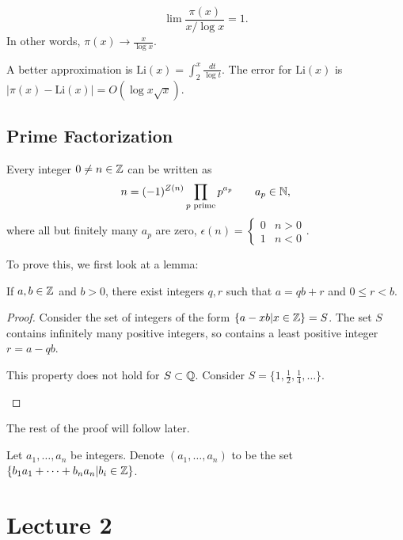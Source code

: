 \documentclass{article}
\begin{document}
\begin{theorem}
    \label{pnt}
    \[\lim \frac{\pi(x)}{x / \log x} = 1.\] In other words, $\pi(x) \to \frac{x}{\log x}$.
\end{theorem}

A better approximation is $\mathrm{Li}(x) = \int_{2}^x \frac{dt}{\log t}$. The error for $\mathrm{Li}(x)$ is $|\pi(x) - \mathrm{Li}(x)| = O(\log x \sqrt x)$.

\subsection{Prime Factorization}
\begin{theorem}
    \label{uniq}
    Every integer $0 \neq n \in \mathbb Z$ can be written as \[n = (-1)^{Z(n)} \prod_{p \text{ prime}} p^{a_p} \qquad a_p \in \mathbb N,\] where all but finitely many $a_p$ are zero, $\epsilon(n) = \begin{cases} 0 & n > 0 \\ 1 & n < 0\end{cases}$.
\end{theorem}

To prove this, we first look at a lemma:
\begin{lemma}
    \label{lemma:1}
    If $a, b \in \mathbb Z$ and $b > 0$, there exist integers $q, r$ such that $a = qb + r$ and $0 \leq r < b$.
\end{lemma}

\begin{proof}
    Consider the set of integers of the form $\{a - xb | x \in \mathbb Z\} = S$. The set $S$ contains infinitely many positive integers, so contains a least positive integer $r = a - qb$.

    \begin{remark}
        This property does not hold for $S \subset \mathbb Q$. Consider $S = \{1, \frac{1}{2}, \frac{1}{4}, \ldots\}$. 
    \end{remark}
\end{proof}

The rest of the proof will follow later.

\begin{definition}
    \label{multset}
    Let $a_1, \ldots, a_n$ be integers. Denote $(a_1, \ldots, a_n)$ to be the set $\{b_1a_1 + \cdots + b_na_n | b_i \in \mathbb Z\}$.
\end{definition}

\section{Lecture 2}
\end{document}
